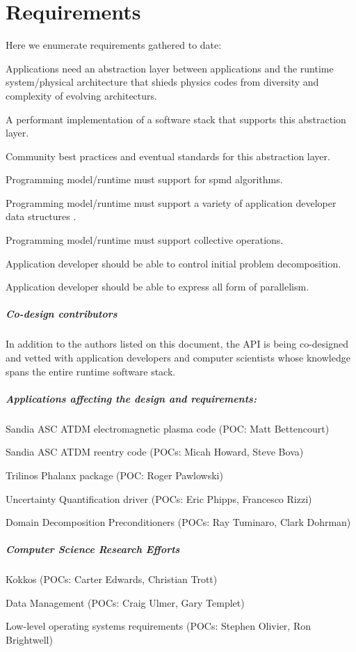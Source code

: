 \chapter{Requirements} 
\label{chap:requirements} 
Here we enumerate requirements gathered to date: 
\begin{compactitem}
\item Applications need an abstraction layer between applications and the
runtime system/physical architecture that shieds physics codes from diversity and
complexity of evolving architecturs.
\item A performant implementation of a software stack that supports this
abstraction layer.
\item Community best practices and eventual standards for this abstraction
layer.
\item Programming model/runtime must support for \gls{spmd} algorithms.
\item Programming model/runtime must support a variety of application developer data structures .
\item Programming model/runtime must support collective operations.
\item Application developer should be able to control initial problem decomposition.
\item Application developer should be able to express all form of parallelism.
\end{compactitem}


\paragraph{Co-design contributors}
In addition to the authors listed on this document,
the \gls{API} is being \gls{co-design}ed and vetted with application developers
and computer scientists whose knowledge spans the entire runtime software stack.

\paragraph{Applications affecting the design and requirements:}
\begin{compactitem}
\item Sandia \gls{ASC} \gls{ATDM} electromagnetic plasma code (POC: Matt Bettencourt)
\item Sandia \gls{ASC} \gls{ATDM} reentry code (POCs: Micah Howard, Steve Bova)
\item \gls{Trilinos} Phalanx package (POC: Roger Pawlowski)
\item Uncertainty Quantification driver (POCs: Eric Phipps, Francesco Rizzi)
\item Domain Decomposition Preconditioners (POCs: Ray Tuminaro, Clark Dohrman)
\end{compactitem}
 
\paragraph{Computer Science Research Efforts}
\begin{compactitem}
\item Kokkos (POCs: Carter Edwards, Christian Trott)
\item Data Management (POCs: Craig Ulmer, Gary Templet)
\item Low-level operating systems requirements (POCs: Stephen Olivier, Ron
    Brightwell)
\end{compactitem}



